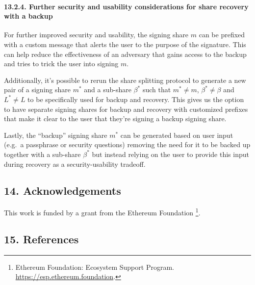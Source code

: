 \documentclass[
]{article}
\begin{document}
\hypertarget{share-recovery-backup-enhancements}{%
\paragraph{13.2.4. Further security and usability considerations for
share recovery with a backup}\label{share-recovery-backup-enhancements}}

For further improved security and usability, the signing share \(m\) can
be prefixed with a custom message that alerts the user to the purpose of
the signature. This can help reduce the effectiveness of an adversary
that gains access to the backup and tries to trick the user into signing
\(m\).

Additionally, it's possible to rerun the share splitting protocol to
generate a new pair of a signing share \(m^ \ast\) and a sub-share
\(\beta ^ \ast\) such that \(m^ \ast \neq m\),
\(\beta ^ \ast \neq \beta\) and \(L^ \ast \neq L\) to be specifically
used for backup and recovery. This gives us the option to have separate
signing shares for backup and recovery with customized prefixes that
make it clear to the user that they're signing a backup signing share.

Lastly, the ``backup'' signing share \(m^ \ast\) can be generated based
on user input (e.g.~a passphrase or security questions) removing the
need for it to be backed up together with a sub-share \(\beta ^ \ast\)
but instead relying on the user to provide this input during recovery as
a security-usability tradeoff.

\hypertarget{acknowledgements}{%
\subsection{14. Acknowledgements}\label{acknowledgements}}

This work is funded by a grant from the Ethereum Foundation \footnote{Ethereum
  Foundation: Ecosystem Support Program.
  \url{https://esp.ethereum.foundation}.}.

\hypertarget{references}{%
\subsection{15. References}\label{references}}
\end{document}
